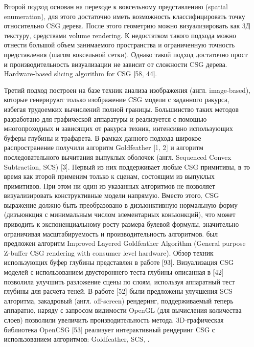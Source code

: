 Второй подход основан на переходе к воксельному представлению (spatial enumeration), для этого достаточно иметь возможность классифицировать точку относительно CSG дерева. После этого геометрию можно визуализировать как 3Д текстуру, средствами volume rendering. К недостатком такого подхода можно отнести большой объем занимаемого пространства и ограниченную точность представления (шагом воксельной сетки). Однако такой подход достаточно прост и производительность визуализации не зависит от сложности CSG дерева. Hardware-based slicing algorithm for CSG [58, 44].

Третий подход построен на базе техник анализа изображения (англ. image-based), которые генерируют только изображение CSG модели с заданного ракурса, избегая трудоемких вычислений полной границы. Большинство таких методов разработано для графической аппаратуры и реализуется с помощью многопроходных и зависящих от ракурса техник, интенсивно использующих буферы глубины и трафарета. В рамках данного подхода широкое распространение получили алгоритм Goldfeather [1, 2] и алгоритм последовательного вычитания выпуклых оболочек (англ. Sequenced Convex Subtraction, SCS) [3]. Первый из них поддерживает любые CSG примитивы, в то время как второй применим только к сценам, состоящим из выпуклых примитивов. При этом ни один из указанных  алгоритмов не позволяет визуализировать конструктивные модели напрямую. Вместо этого, CSG выражение должно быть преобразовано в дизъюнктивную нормальную форму (дизъюнкция с минимальным числом элементарных конъюнкций), что может приводить к экспоненциальному росту размера булевой формулы, значительно ограничивая  масштабируемость и производительность алгоритмов.  был предложен алгоритм Improved Layered Goldfeather Algorithm (General purpose Z-buffer CSG rendering with consumer level hardware). Обзор техник использующих буфер глубины представлен в работе [93]. Визуализация CSG моделей с использованием двустороннего теста глубины описанная в [42] позволила улучшить разложение сцены по слоям, используя аппаратный тест глубины для расчета теней. В работе [52] были предложены улучшения SCS алгоритма, закадровый (англ. off-screen) рендеринг, поддерживаемый теперь аппаратно, наряду с запросом видимости OpenGL (для вычисления количества слоев) позволили увеличить производительность метода. 3D-графическая библиотека OpenCSG [53] реализует интерактивный рендеринг CSG с использованием алгоритмов: Goldfeather, SCS, . 

